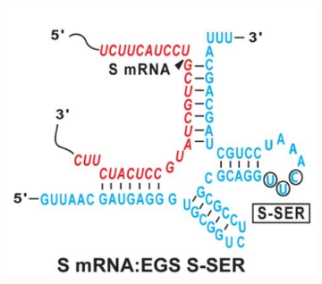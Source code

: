 \documentclass[twoside,a4paper]{report}
\begin{document}
	 
	 \begin{figure}[h!tb]
	 	\centering
	 	\begin{subfigure}{.25\textwidth}
	 		\centering
	 		\includegraphics[width=.9\linewidth]{mrnaegs}	
	 		\label{fig:mrnaegs}
	 	\end{subfigure}


\end{figure}
\end{document}
